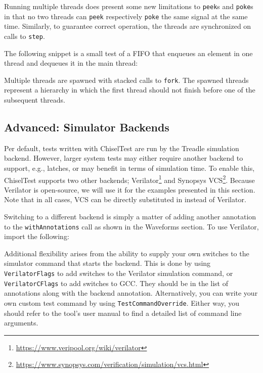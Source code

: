 \documentclass[%
    10pt,
    headinclude, footexclude,
    openright, %
    notitlepage,
    cleardoubleempty,
    headsepline,
    pointlessnumbers,
    bibtotoc, idxtotoc,
    ]{scrbook}
\newcommand{\code}[1]{{\small{\texttt{#1}}}}
\newcommand{\myref}[2]{\href{#1}{#2}}
\renewcommand{\myref}[2]{{#2}{\footnote{\url{#1}}}}
\begin{document}
Running multiple threads does present some new limitations to \code{peek}s and 
\code{poke}s in that no two threads can \code{peek} respectively \code{poke} the 
same signal at the same time. Similarly, to guarantee correct operation, the threads 
are synchronized on calls to \code{step}.

The following snippet is a small test of a FIFO that enqueues an element in one thread 
and dequeues it in the main thread:


Multiple threads are spawned with stacked calls to \code{fork}. The spawned threads 
represent a hierarchy in which the first thread should not finish before one of the 
subsequent threads.

\subsection{Advanced: Simulator Backends}

Per default, tests written with ChiselTest are run by the Treadle simulation backend. However, 
larger system tests may either require another backend to support, e.g., latches, or may 
benefit in terms of simulation time. To enable this, ChiselTest supports two other backends; 
\myref{https://www.veripool.org/wiki/verilator}{Verilator} and 
\myref{https://www.synopsys.com/verification/simulation/vcs.html}{Synopsys VCS}. Because 
Verilator is open-source, we will use it for the examples presented in this section. Note 
that in all cases, VCS can be directly substituted in instead of Verilator.

Switching to a different backend is simply a matter of adding another annotation to the 
\code{withAnnotations} call as shown in the Waveforms section. To use Verilator, import 
the following:


Additional flexibility arises from the ability to supply your own switches to the 
simulator command that starts the backend. This is done by using \code{VerilatorFlags} 
to add switches to the Verilator simulation command, or \code{VerilatorCFlags} to add 
switches to GCC. They should be in the list of annotations along with the backend 
annotation. Alternatively, you can write your own custom test command by using 
\code{TestCommandOverride}. Either way, you should refer to the tool's user manual 
to find a detailed list of command line arguments.
\end{document}
